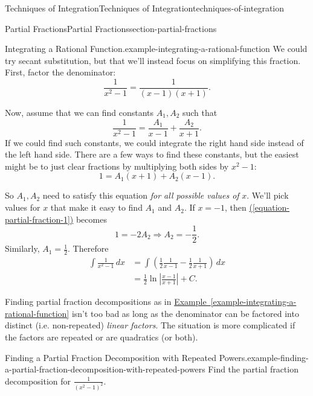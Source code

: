\documentclass[oneside,10pt,]{book}
\numberwithin{equation}{section}
\begin{document}
\begin{chapterptx}{Techniques of Integration}{}{Techniques of Integration}{}{}{techniques-of-integration}
\begin{sectionptx}{Partial Fractions}{}{Partial Fractions}{}{}{section-partial-fractions}
\begin{example}{Integrating a Rational Function.}{example-integrating-a-rational-function}
\hypertarget{p-551}{}%
We could try secant substitution, but that we'll instead focus on simplifying this fraction. First, factor the denominator:%
\begin{equation*}
\frac{1}{x^{2} - 1} = \frac{1}{(x-1)(x+1)}.
\end{equation*}
%
\par
\hypertarget{p-552}{}%
Now, assume that we can find constants \(A_{1}, A_{2}\) such that%
\begin{equation*}
\frac{1}{x^{2} - 1} = \frac{A_{1}}{x-1} + \frac{A_{2}}{x + 1}.
\end{equation*}
If we could find such constants, we could integrate the right hand side instead of the left hand side. There are a few ways to find these constants, but the easiest might be to just clear fractions by multiplying both sides by \(x^{2} - 1\):%
\begin{equation}
1 = A_{1}(x + 1) + A_{2}(x - 1).\label{equation-partial-fraction-1}
\end{equation}
%
\par
\hypertarget{p-553}{}%
So \(A_{1},A_{2}\) need to satisfy this equation \emph{for all possible values of} \(x\). We'll pick values for \(x\) that make it easy to find \(A_{1}\) and \(A_{2}\). If \(x = -1\), then \hyperref[equation-partial-fraction-1]{(\ref{equation-partial-fraction-1})} becomes%
\begin{equation*}
1 = -2A_{2} \Rightarrow A_{2} = -\frac{1}{2}.
\end{equation*}
Similarly, \(A_{1} = \frac{1}{2}.\) Therefore%
%
\begin{align*}
\int\frac{1}{x^{2}-1}\,dx & = \int\left(\frac{1}{2}\frac{1}{x-1} - \frac{1}{2}\frac{1}{x+1}\right)\,dx \\
& = \frac{1}{2}\ln\left|\frac{x-1}{x+1}\right| + C. 
\end{align*}
\end{example}
\hypertarget{p-554}{}%
Finding partial fraction decompositions as in \hyperref[example-integrating-a-rational-function]{Example~\ref{example-integrating-a-rational-function}} isn't too bad as long as the denominator can be factored into distinct (i.e. non-repeated) \emph{linear factors}. The situation is more complicated if the factors are repeated or are quadratics (or both).%
\begin{example}{Finding a Partial Fraction Decomposition with Repeated Powers.}{example-finding-a-partial-fraction-decomposition-with-repeated-powers}%
\hypertarget{p-555}{}%
Find the partial fraction decomposition for \(\frac{1}{(x^{2} - 1)^{2}}\).%

\end{example}
\end{sectionptx}
\end{chapterptx}
\end{document}
